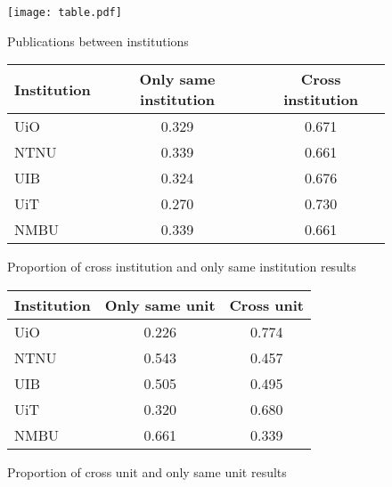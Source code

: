 \begin{figure}[h]
  \centering
  \texttt{[image: table.pdf]}
  \caption{Publications between institutions}
  \label{fig:result}
\end{figure}

\begin{figure}[h]
	\centering
	\begin{tabular}{| l || c | c |}
		\hline
		Institution	& Only same institution	& Cross institution	\\ \hline
		UiO		& 0.329			& 0.671			\\
		NTNU		& 0.339			& 0.661			\\
		UIB		& 0.324			& 0.676			\\
		UiT		& 0.270			& 0.730			\\
		NMBU		& 0.339			& 0.661			\\
		\hline
	\end{tabular}
	\caption{Proportion of cross institution and only same institution results}
	\label{tab:institution-proportion}
\end{figure}

\begin{figure}[h]
	\centering
	\begin{tabular}{| l || c | c |}
		\hline
		Institution	& Only same unit	& Cross unit	\\ \hline
		UiO		& 0.226			& 0.774		\\
		NTNU		& 0.543			& 0.457		\\
		UIB		& 0.505			& 0.495		\\
		UiT		& 0.320			& 0.680		\\
		NMBU		& 0.661			& 0.339		\\
		\hline
	\end{tabular}
	\caption{Proportion of cross unit and only same unit results}
	\label{tab:unit-proportion}
\end{figure}
